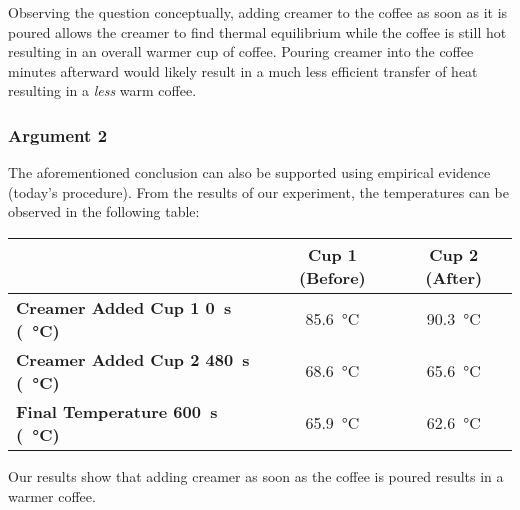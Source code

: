 \documentclass{article}
\begin{document}
Observing the question conceptually, adding creamer to the coffee as soon as it is poured allows the creamer to find thermal equilibrium while the coffee is still hot resulting in an overall warmer cup of coffee. Pouring creamer into the coffee minutes afterward would likely result in a much less efficient transfer of heat resulting in a \textit{less} warm coffee.

\subsubsection{Argument 2}

The aforementioned conclusion can also be supported using empirical evidence (today's procedure). From the results of our experiment, the temperatures can be observed in the following table:

\begin{tabular}{ | l | c | c | }
	\hline
	& \textbf{Cup 1 (Before)} & \textbf{Cup 2 (After)} \\
	\hline
	\textbf{Creamer Added Cup 1 \SI{0}{\second} (\SI{}{\celsius})} & \SI{85.6}{\celsius} & \SI{90.3}{\celsius} \\
	\hline
	\textbf{Creamer Added Cup 2 \SI{480}{\second} (\SI{}{\celsius})} & \SI{68.6}{\celsius} & \SI{65.6}{\celsius} \\
	\hline
	\textbf{Final Temperature \SI{600}{\second} (\SI{}{\celsius})} & \SI{65.9}{\celsius} & \SI{62.6}{\celsius} \\
	\hline
\end{tabular}
Our results show that adding creamer as soon as the coffee is poured results in a warmer coffee.
\end{document}
